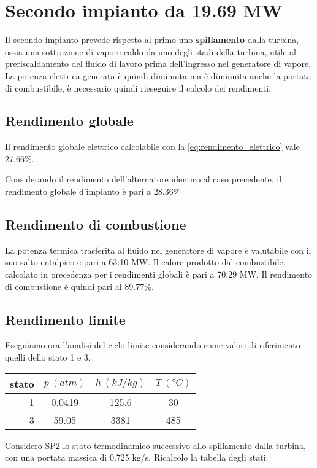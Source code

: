 \section{Secondo impianto da 19.69 MW}
Il secondo impianto prevede rispetto al primo uno \textbf{spillamento} dalla turbina, ossia una sottrazione di vapore caldo da uno degli stadi della turbina, 
utile al preriscaldamento del fluido di lavoro prima dell'ingresso nel generatore di vapore.
La potenza elettrica generata è quindi diminuita ma è diminuita anche la portata di combustibile, è necessario quindi rieseguire il calcolo dei rendimenti.
\subsection{Rendimento globale}
Il rendimento globale elettrico calcolabile con la \eqref{eq:rendimento_elettrico} vale 27.66\%.

Considerando il rendimento dell'alternatore identico al caso precedente, il rendimento globale d'impianto è pari a 28.36\%
\subsection{Rendimento di combustione}
La potenza termica trasferita al fluido nel generatore di vapore è valutabile con il suo salto entalpico e pari a 63.10 MW.
Il calore prodotto dal combustibile, calcolato in precedenza per i rendimenti globali è pari a 70.29 MW.
Il rendimento di combustione è quindi pari al 89.77\%.

\subsection{Rendimento limite}
\label{subsec:rendimento_limite_2}
Eseguiamo ora l'analisi del ciclo limite considerando come valori di riferimento quelli dello stato 1 e 3.
\begin{center}
    \begin{tabular}{r|c|c|c}
        stato    & $p\ (atm)$ & $h\ (kJ/kg)$ & $T\ (\text{°}C) $\\ \hline
        1   &        0.0419 &          125.6   &           30     \\ \hline
        3   &        59.05  &           3381   &           485
    \end{tabular}
\end{center}
Considero SP2 lo stato termodinamico successivo allo spillamento dalla turbina, con una portata massica di 0.725 kg/s. Ricalcolo la tabella degli stati.

